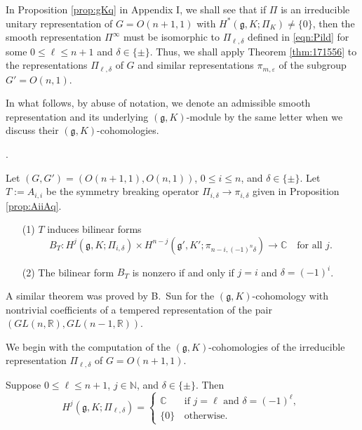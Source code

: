 In Proposition \ref{prop:gKq} in Appendix I, 
 we shall see
 that if $\Pi$ is an irreducible unitary representation
 of $G=O(n+1,1)$
 with $H^{\ast}({\mathfrak{g}},K;\Pi_K) \ne \{0\}$, 
 then the smooth representation $\Pi^{\infty}$ must be isomorphic
 to $\Pi_{\ell, \delta}$ defined in \eqref{eqn:Pild}
 for some $0 \le \ell \le n+1$ and $\delta \in \{\pm\}$.  
Thus, 
 we shall apply Theorem \ref{thm:171556}
 to the representations $\Pi_{\ell, \delta}$ of $G$
 and similar representations $\pi_{m,\varepsilon}$ 
 of the subgroup $G'=O(n,1)$.  



In what follows,
 by abuse of notation,
 we denote an admissible  smooth representation and its underlying $({\mathfrak{g}},K)$-module by the same letter 
 when we discuss their $({\mathfrak{g}},K)$-cohomologies. 



.
\begin{theorem}
\label{thm:gKOn}
Let $(G,G')=(O(n+1,1),O(n,1))$, 
 $0 \le i \le n$, 
 and $\delta \in \{ \pm \}$.  
Let $T:=A_{i,i}$ be the symmetry breaking operator 
 $\Pi_{i,\delta} \to \pi_{i,\delta}$
 given  in Proposition \ref{prop:AiiAq}.  
\begin{enumerate}
\item[{\rm{(1)}}]
$T$ induces bilinear forms
\[
   B_T \colon 
   H^j({\mathfrak{g}}, K; \Pi_{i,\delta}) 
   \times 
   H^{n-j}({\mathfrak{g}}', K'; \pi_{n-i,(-1)^n \delta})
   \to {\mathbb{C}}
\quad
\text{for all $j$.}
\]
\item[{\rm{(2)}}]
The bilinear form $B_T$ is nonzero
 if and only if $j=i$ and $\delta=(-1)^i$.  
\end{enumerate}
\end{theorem}

\begin{remark}
A similar theorem was proved 
 by B.~Sun \cite{S}
 for the $(\mathfrak{g},K)$-cohomology with nontrivial coefficients
 of a tempered representation
 of the  pair $(GL(n,\mathbb R), GL(n-1,\mathbb R))$. 
\end{remark}


We begin with the computation of the $({\mathfrak{g}},K)$-cohomologies
 of the irreducible representation $\Pi_{\ell, \delta}$ of $G=O(n+1,1)$.  
\begin{lemma}
\label{lem:172145}
Suppose $0 \le \ell \le n+1$, 
 $j \in {\mathbb{N}}$, 
 and $\delta \in \{\pm\}$. 
Then 
\[
   H^j({\mathfrak{g}},K; \Pi_{\ell, \delta})
  =
\begin{cases}
{\mathbb{C}} \quad &\text{if $j=\ell$ and $\delta=(-1)^{\ell}$, }
\\
\{0\} &\text{otherwise.}
\end{cases}
\]
\end{lemma}

